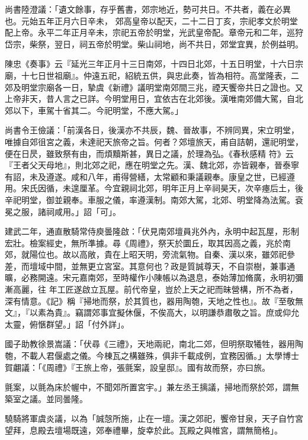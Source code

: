 \begin{pinyinscope}
 尚書陸澄議：「遺文餘事，存乎舊書，郊宗地近，勢可共日。不共者，義在必異也。元始五年正月六日辛未，
 郊高皇帝以配天，二十二日丁亥，宗祀孝文於明堂配上帝。永平二年正月辛未，宗祀五帝於明堂，光武皇帝配。章帝元和二年，巡狩岱宗，柴祭，翌日，祠五帝於明堂。柴山祠地，尚不共日，郊堂宜異，於例益明。



 陳忠《奏事》云『延光三年正月十三日南郊，十四日北郊，十五日明堂，十六日宗廟，十七日世祖廟』。仲遠五祀，紹統五供，與忠此奏，皆為相符。高堂隆表，二郊及明堂宗廟各一日，摯虞《新禮》議明堂南郊間三兆，禋天饗帝共日之證也。又上帝非天，昔人言之已詳。今明堂用日，宜依古在北郊後。漢唯南郊備大駕，自北郊以下，車駕十省其二。今祀明堂，不應大駕。」



 尚書令王儉議：「前漢各日，後漢亦不共辰，魏、晉故事，不辨同異，宋立明堂，唯據自郊徂宮之義，未達祀天旅帝之旨。何者？郊壇旅天，甫自詰朝，還祀明堂，便在日昃，雖致祭有由，而煩黷斯甚，異日之議，於理為弘。《春秋感精
 符》云『王者父天母地』，則北郊之祀，應在明堂之先。漢、魏北郊，亦皆親奉，晉泰寧有詔，未及遵遂。咸和八年，甫得營繕，太常顧和秉議親奉。康皇之世，已經遵用。宋氏因循，未遑厘革。今宜親祠北郊，明年正月上辛祠昊天，次辛瘞后土，後辛祀明堂，御並親奉。車服之儀，率遵漢制。南郊大駕，北郊、明堂降為法駕。袞冕之服，諸祠咸用。」詔「可」。



 建武二年，通直散騎常侍庾曇隆啟：「伏見南郊壇員兆外內，永明中起瓦屋，形制宏壯。檢案經史，無所準據。尋《周禮》，祭天於圜丘，取其因高之義，兆於南郊，就陽位也。故以高敞，貴在上昭天明，旁流氣物。自秦、漢以來，雖郊祀參差，而壇域中間，並無更立宮室。其意何也？政是質誠尊天，不自崇樹，兼事通曠，必務開遠。宋元嘉南郊，至時權作小陳帳以為退息，泰始薄加脩廣，永明初彌漸高麗，往
 年工匠遂啟立瓦屋。前代帝皇，豈於上天之祀而昧營構，所不為者，深有情意。《記》稱『掃地而祭，於其質也，器用陶匏，天地之性也』。故『至敬無文』，『以素為貴』。竊謂郊事宜擬休偃，不俟高大，以明謙恭肅敬之旨。庶或仰允太靈，俯愜群望。」詔「付外詳」。



 國子助教徐景嵩議：「伏尋《三禮》，天地兩祀，南北二郊，但明祭取犧牲，器用陶匏，不載人君偃處之儀。今棟瓦之構雖殊，俱非千載成例，宜務因循。」太學博士賀翽議：「《周禮》『王旅上帝，張氈案，設皇邸』。國有故而祭，亦曰旅。



 氈案，以氈為床於幄中，不聞郊所置宮宇。」兼左丞王摛議，掃地而祭於郊，謂無築室之議。並同曇隆。



 驍騎將軍虞炎議，以為「誠愨所施，止在一壇。漢之郊祀，饗帝甘泉，天子自竹宮望拜，息殿去壇場既遠，郊奉禮畢，旋幸於此。瓦殿之與帷宮，謂無簡格」。




\end{pinyinscope}
